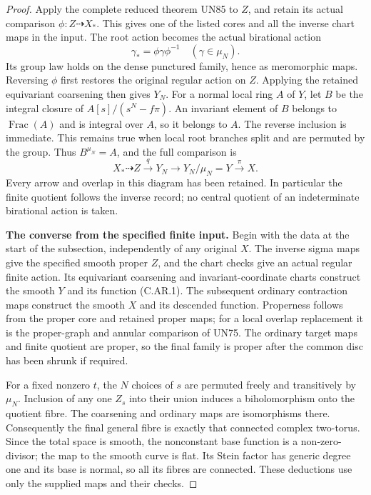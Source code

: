 \begin{proof}
Apply the complete reduced theorem UN85 to
\(Z\), and retain its actual comparison
\(\phi:Z\dashrightarrow X_*\). This gives
one of the listed cores and all the inverse
chart maps in the input. The root action
becomes the actual birational action
\[
            \gamma_* =\phi\gamma\phi^{-1}
                            \quad(\gamma\in\mu_N).
 \tag{C.AR.12}
\]
Its group law holds on the dense punctured
family, hence as meromorphic maps. Reversing
\(\phi\) first restores the original regular
action on \(Z\). Applying the retained
equivariant coarsening then gives \(Y_N\).
For a normal local ring \(A\) of \(Y\),
let \(B\) be the integral closure of
\(A[s]/(s^N-f\pi)\). An invariant element
of \(B\) belongs to \(\operatorname{Frac}(A)\)
and is integral over \(A\), so it belongs
to \(A\). The reverse inclusion is immediate.
This remains true when local root branches
split and are permuted by the group. Thus
\(B^{\mu_N}=A\), and the full comparison is
\[
 X_*\dashrightarrow Z\xrightarrow{q}Y_N
              \longrightarrow Y_N/\mu_N=Y
                       \xrightarrow{\pi}X.
 \tag{C.AR.13}
\]
Every arrow and overlap in this diagram has
been retained. In particular the finite
quotient follows the inverse record; no
central quotient of an indeterminate
birational action is taken.

\par\medskip\noindent\textbf{The converse from the specified finite input.}
Begin with the data at the start of the
subsection, independently of any original
\(X\). The inverse sigma maps give the
specified smooth proper \(Z\), and the
chart checks give an actual regular finite
action. Its equivariant coarsening and
invariant-coordinate charts construct the
smooth \(Y\) and its function (C.AR.1).
The subsequent ordinary contraction maps
construct the smooth \(X\) and its descended
function. Properness follows from the
proper core and retained proper maps;
for a local overlap replacement it is the
proper-graph and annular comparison of
UN75. The ordinary target maps and finite
quotient are proper, so the final family
is proper after the common disc has been
shrunk if required.

For a fixed nonzero \(t\), the \(N\)
choices of \(s\) are permuted freely and
transitively by \(\mu_N\). Inclusion of
any one \(Z_s\) into their union induces
a biholomorphism onto the quotient fibre.
The coarsening and ordinary maps are
isomorphisms there. Consequently the
final general fibre is exactly that
connected complex two-torus. Since the
total space is smooth, the nonconstant
base function is a non-zero-divisor;
the map to the smooth curve is flat.
Its Stein factor has generic degree one
and its base is normal, so all its fibres
are connected. These deductions use only
the supplied maps and their checks.


\end{proof}
